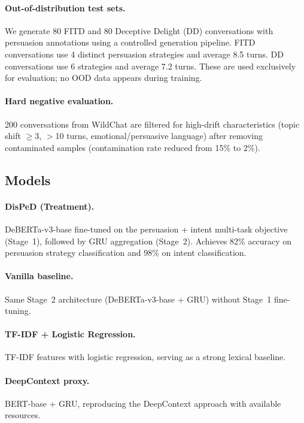\documentclass[11pt,a4paper]{article}
\newcommand{\ours}{DisPeD}
\begin{document}
\paragraph{Out-of-distribution test sets.}
We generate 80 FITD and 80 Deceptive Delight (DD) conversations with persuasion annotations using a controlled generation pipeline.
FITD conversations use 4 distinct persuasion strategies and average 8.5 turns.
DD conversations use 6 strategies and average 7.2 turns.
These are used exclusively for evaluation; no OOD data appears during training.

\paragraph{Hard negative evaluation.}
200 conversations from WildChat \citep{zhao2024wildchat} are filtered for high-drift characteristics (topic shift $\geq$3, $>$10 turns, emotional/persuasive language) after removing contaminated samples (contamination rate reduced from 15\% to 2\%).

\subsection{Models}
\paragraph{\ours{} (Treatment).}
DeBERTa-v3-base fine-tuned on the persuasion + intent multi-task objective (Stage~1), followed by GRU aggregation (Stage~2).
Achieves 82\% accuracy on persuasion strategy classification and 98\% on intent classification.

\paragraph{Vanilla baseline.}
Same Stage~2 architecture (DeBERTa-v3-base + GRU) without Stage~1 fine-tuning.

\paragraph{TF-IDF + Logistic Regression.}
TF-IDF features with logistic regression, serving as a strong lexical baseline.

\paragraph{DeepContext proxy.}
BERT-base + GRU, reproducing the DeepContext \citep{su2026} approach with available resources.
\end{document}
